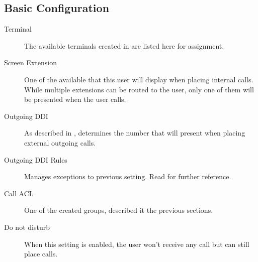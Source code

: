 \documentclass[letterpaper,10pt,english]{sphinxmanual}
\begin{document}
\subsection{Basic Configuration}
\label{pbx_features/users:basic-configuration}
\noindent{}
\begin{description}
\item[{Terminal}] \leavevmode{}\label{pbx_features/users:term-terminal}
The available terminals created in {\hyperref[pbx_features/terminals:terminals]{}} are listed here
for assignment.

\item[{Screen Extension}] \leavevmode{}\label{pbx_features/users:term-screen-extension}
One of the available {\hyperref[pbx_features/extensions:extensions]{}} that this user will display when
placing internal calls. While multiple extensions can be routed to the
user, only one of them will be presented when the user calls.

\item[{Outgoing DDI}] \leavevmode{}\label{pbx_features/users:term-outgoing-ddi}
As described in {\hyperref[external_outgoing_calls/external_ddi:external\string-ddi]{}}, determines the number that will
present when placing external outgoing calls.

\item[{Outgoing DDI Rules}] \leavevmode{}\label{pbx_features/users:term-outgoing-ddi-rules}
Manages exceptions to previous setting. Read {\hyperref[pbx_features/outgoingddi_rules:outgoingddi\string-rules]{}}
for further reference.

\item[{Call ACL}] \leavevmode{}\label{pbx_features/users:term-call-acl}
One of the created {\hyperref[pbx_features/call_permissions:call\string-permissions]{}} groups, described
it the previous sections.

\item[{Do not disturb}] \leavevmode{}\label{pbx_features/users:term-do-not-disturb}
When this setting is enabled, the user won't receive any call but can
still place calls.


\end{description}
\end{document}
